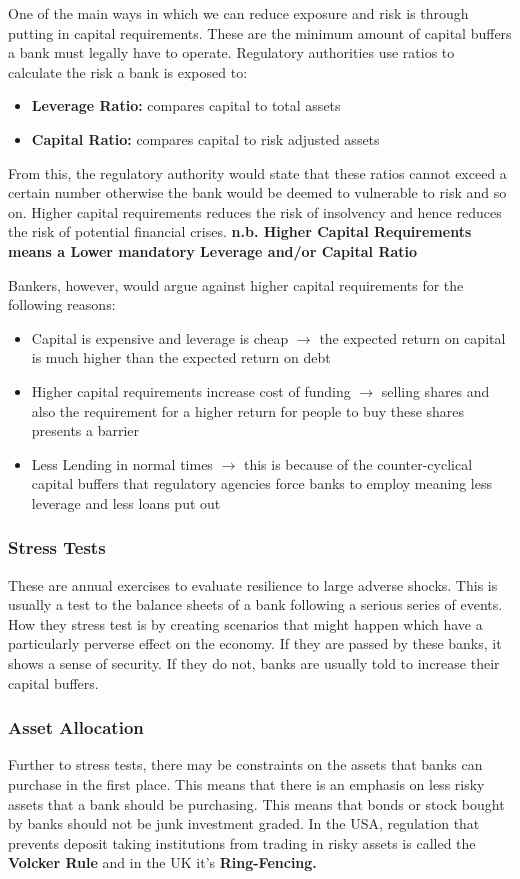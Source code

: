 \documentclass[12pt, letterpaper]{article}
\begin{document}
One of the main ways in which we can reduce exposure and risk is through putting in capital requirements. These are the minimum amount of capital buffers a bank must legally have to operate. Regulatory authorities use ratios to calculate the risk a bank is exposed to:
\begin{itemize}
	\item \textbf{Leverage Ratio:} compares capital to total assets
	\item \textbf{Capital Ratio:} compares capital to risk adjusted assets
\end{itemize}
From this, the regulatory authority would state that these ratios cannot exceed a certain number otherwise the bank would be deemed to vulnerable to risk and so on. Higher capital requirements reduces the risk of insolvency and hence reduces the risk of potential financial crises. \textbf{n.b. Higher Capital Requirements means a Lower mandatory Leverage and/or Capital Ratio}

Bankers, however, would argue against higher capital requirements for the following reasons:
\begin{itemize}
	\item Capital is expensive and leverage is cheap $\rightarrow$ the expected return on capital is much higher than the expected return on debt
	\item Higher capital requirements increase cost of funding $\rightarrow$ selling shares and also the requirement for a higher return for people to buy these shares presents a barrier
	\item Less Lending in normal times $\rightarrow$ this is because of the counter-cyclical capital buffers that regulatory agencies force banks to employ meaning less leverage and less loans put out
\end{itemize}

\subsubsection{Stress Tests}
These are annual exercises to evaluate resilience to large adverse shocks. This is usually a test to the balance sheets of a bank following a serious series of events. How they stress test is by creating scenarios that might happen which have a particularly perverse effect on the economy. If they are passed by these banks, it shows a sense of security. If they do not, banks are usually told to increase their capital buffers.

\subsubsection{Asset Allocation}
Further to stress tests, there may be constraints on the assets that banks can purchase in the first place. This means that there is an emphasis on less risky assets that a bank should be purchasing. This means that bonds or stock bought by banks should not be junk investment graded. In the USA, regulation that prevents deposit taking institutions from trading in risky assets is called the \textbf{Volcker Rule} and in the UK it's \textbf{Ring-Fencing.}
\end{document}
